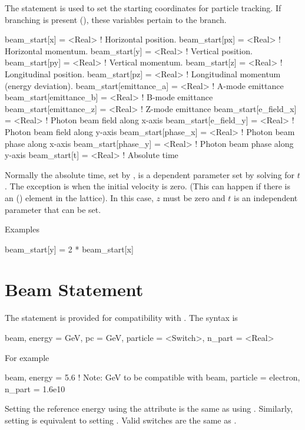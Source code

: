 The  statement is used to set the starting coordinates
for particle tracking. If branching is present (), these variables
pertain to the  branch.
\begin{example}
  beam_start[x]           = <Real>   ! Horizontal position.
  beam_start[px]          = <Real>   ! Horizontal momentum.
  beam_start[y]           = <Real>   ! Vertical position.
  beam_start[py]          = <Real>   ! Vertical momentum.
  beam_start[z]           = <Real>   ! Longitudinal position.
  beam_start[pz]          = <Real>   ! Longitudinal momentum (energy deviation).
  beam_start[emittance_a] = <Real>   ! A-mode emittance
  beam_start[emittance_b] = <Real>   ! B-mode emittance
  beam_start[emittance_z] = <Real>   ! Z-mode emittance
  beam_start[e_field_x]   = <Real>   ! Photon beam field along x-axis
  beam_start[e_field_y]   = <Real>   ! Photon beam field along y-axis
  beam_start[phase_x]     = <Real>   ! Photon beam phase along x-axis
  beam_start[phase_y]     = <Real>   ! Photon beam phase along y-axis
  beam_start[t]           = <Real>   ! Absolute time
\end{example}
Normally the absolute time, set by , is a dependent
parameter set by solving  for $t$. The exception is when the
initial velocity is zero. (This can happen if there is an 
() element in the lattice). In this case, $z$ must be
zero and $t$ is an independent parameter that can be set.

\noindent
Examples
\begin{example}
  beam_start[y] = 2 * beam_start[x]
\end{example}

\section{Beam Statement}

The  statement is provided for compatibility with \mad. The syntax is
\begin{example}
  beam, energy = GeV, pc = GeV, particle = <Switch>, n_part = <Real>
\end{example}
For example
\begin{example}
  beam, energy = 5.6  ! Note: GeV to be compatible with \mad
  beam, particle = electron, n_part = 1.6e10
\end{example}
Setting the reference energy using the  attribute is the
same as using . Similarly, setting  is
equivalent to setting . Valid  switches
are the same as .

